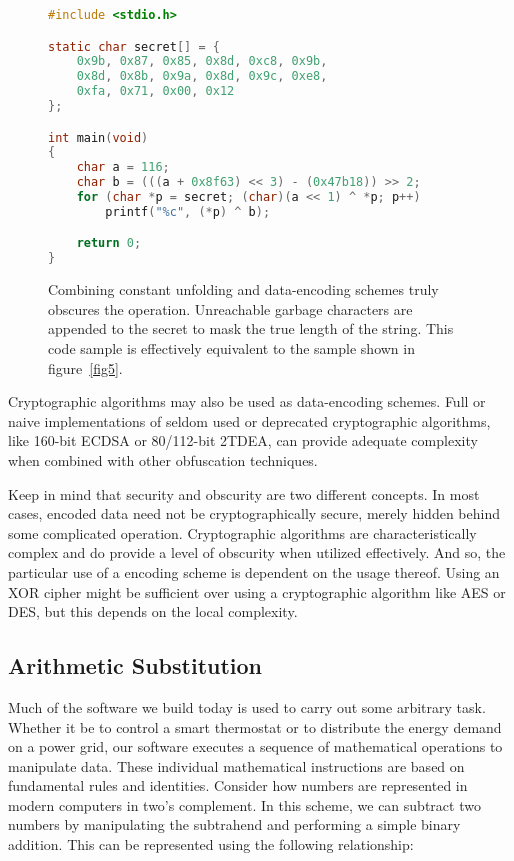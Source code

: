 \documentclass[conference]{IEEEtran}
\begin{document}
\begin{figure}[h]
\begin{lstlisting}[language=C,basicstyle=\footnotesize]
#include <stdio.h>

static char secret[] = {
    0x9b, 0x87, 0x85, 0x8d, 0xc8, 0x9b,
    0x8d, 0x8b, 0x9a, 0x8d, 0x9c, 0xe8,
    0xfa, 0x71, 0x00, 0x12
};

int main(void)
{
    char a = 116;
    char b = (((a + 0x8f63) << 3) - (0x47b18)) >> 2;
    for (char *p = secret; (char)(a << 1) ^ *p; p++)
        printf("%c", (*p) ^ b);

    return 0;
}
\end{lstlisting}
\caption{Combining constant unfolding and data-encoding schemes truly obscures the operation. Unreachable garbage characters are appended to the secret to mask the true length of the string. This code sample is effectively equivalent to the sample shown in figure~\ref{fig5}.}
\label{fig7}
\end{figure}

Cryptographic algorithms may also be used as data-encoding schemes. Full or naive implementations of seldom used or deprecated cryptographic algorithms, like 160-bit ECDSA or 80/112-bit 2TDEA, can provide adequate complexity when combined with other obfuscation techniques.

Keep in mind that security and obscurity are two different concepts. In most cases, encoded data need not be cryptographically secure, merely hidden behind some complicated operation. Cryptographic algorithms are characteristically complex and do provide a level of obscurity when utilized effectively. And so, the particular use of a encoding scheme is dependent on the usage thereof. Using an XOR cipher might be sufficient over using a cryptographic algorithm like AES or DES, but this depends on the local complexity.

\subsection{Arithmetic Substitution}
Much of the software we build today is used to carry out some arbitrary task. Whether it be to control a smart thermostat or to distribute the energy demand on a power grid, our software executes a sequence of mathematical operations to manipulate data. These individual mathematical instructions are based on fundamental rules and identities. Consider how numbers are represented in modern computers in two's complement. In this scheme, we can subtract two numbers by manipulating the subtrahend and performing a simple binary addition. This can be represented using the following relationship:
\end{document}
